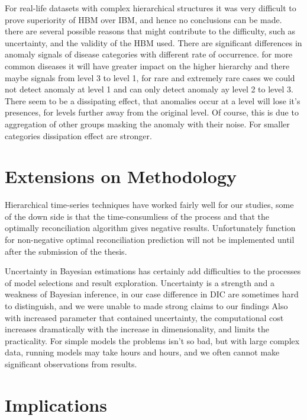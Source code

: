 \newpara

For real-life datasets with complex hierarchical structures it was very difficult to prove superiority of HBM over IBM, and hence no conclusions can be made. there are several possible reasons that might contribute to the difficulty, such as uncertainty, and the validity of the HBM used. There are significant differences in anomaly signals of disease categories with different rate of occurrence. for more common diseases it will have greater impact on the higher hierarchy and there maybe signals from level 3 to level 1, for rare and extremely rare cases we could not detect anomaly at level 1 and can only detect anomaly ay level 2 to level 3. There seem to be a dissipating effect, that anomalies occur at a level will lose it's presences, for levels further away from the original level. Of course, this is due to aggregation of other groups masking the anomaly with their noise. For smaller categories dissipation effect are stronger.

\section{Extensions on Methodology}


Hierarchical time-series techniques have worked fairly well for our studies, some of the down side is that the time-consumliess of the process and that the optimally reconciliation algorithm gives negative results. Unfortunately function for non-negative optimal reconciliation prediction will not be implemented until after the submission of the thesis. 

Uncertainty in Bayesian estimations has certainly add difficulties to the processes of model selections and result exploration. Uncertainty is a strength and a weakness of Bayesian inference, in our case difference in DIC are sometimes hard to distinguish, and we were unable to made strong claims to our findings   Also with increased parameter that contained uncertainty, the computational cost increases dramatically with the increase in dimensionality, and limits the practicality. For simple models the problems isn't so bad, but with large complex data, running models may take hours and hours, and we often cannot make significant observations from results.    

\section{Implications}

